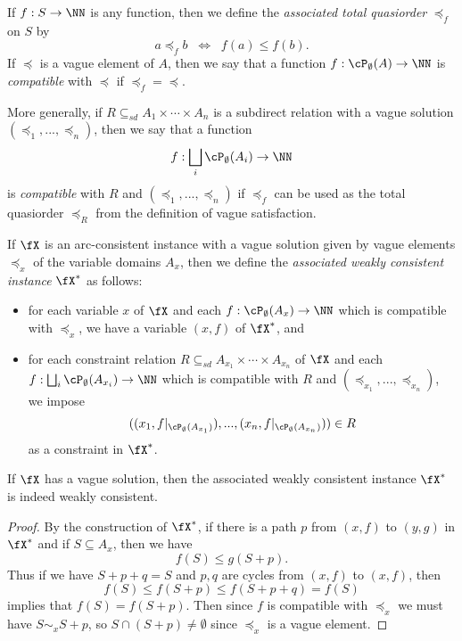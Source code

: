 \begin{defn} If $f : S \rightarrow \NN$ is any function, then we define the \emph{associated total quasiorder} $\preceq_f$ on $S$ by
\[
a \preceq_f b \;\; \iff \;\; f(a) \le f(b).
\]
If $\preceq$ is a vague element of $A$, then we say that a function $f : \cP_\emptyset(A) \rightarrow \NN$ is \emph{compatible} with $\preceq$ if $\preceq_f = \preceq$.

More generally, if $R \subseteq_{sd} A_1 \times \cdots \times A_n$ is a subdirect relation with a vague solution $(\preceq_1, ..., \preceq_n)$, then we say that a function
\[
f : \bigsqcup_i \cP_\emptyset(A_i) \rightarrow \NN
\]
is \emph{compatible} with $R$ and $(\preceq_1, ..., \preceq_n)$ if $\preceq_f$ can be used as the total quasiorder $\preceq_R$ from the definition of vague satisfaction.
\end{defn}

\begin{defn} If $\fX$ is an arc-consistent instance with a vague solution given by vague elements $\preceq_x$ of the variable domains $A_x$, then we define the \emph{associated weakly consistent instance} $\fX^*$ as follows:
\begin{itemize}
\item for each variable $x$ of $\fX$ and each $f : \cP_\emptyset(A_x) \rightarrow \NN$ which is compatible with $\preceq_x$, we have a variable $(x,f)$ of $\fX^*$, and
\item for each constraint relation $R \subseteq_{sd} A_{x_1} \times \cdots \times A_{x_n}$ of $\fX$ and each $f : \bigsqcup_i \cP_\emptyset(A_{x_i}) \rightarrow \NN$ which is compatible with $R$ and $(\preceq_{x_1}, ..., \preceq_{x_n})$, we impose
\[
((x_1,f|_{\cP_\emptyset(A_{x_1})}), ..., (x_n,f|_{\cP_\emptyset(A_{x_n})})) \in R
\]
as a constraint in $\fX^*$.
\end{itemize}
\end{defn}

\begin{prop} If $\fX$ has a vague solution, then the associated weakly consistent instance $\fX^*$ is indeed weakly consistent.
\end{prop}
\begin{proof} By the construction of $\fX^*$, if there is a path $p$ from $(x,f)$ to $(y,g)$ in $\fX^*$ and if $S \subseteq A_x$, then we have
\[
f(S) \le g(S+p).
\]
Thus if we have $S + p + q = S$ and $p,q$ are cycles from $(x,f)$ to $(x,f)$, then
\[
f(S) \le f(S+p) \le f(S+p+q) = f(S)
\]
implies that $f(S) = f(S+p)$. Then since $f$ is compatible with $\preceq_x$ we must have $S \sim_x S+p$, so $S \cap (S+p) \ne \emptyset$ since $\preceq_x$ is a vague element.
\end{proof}

